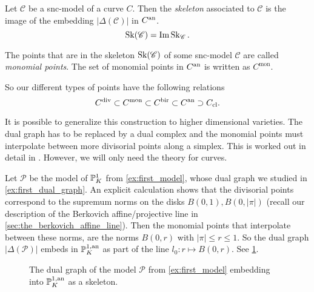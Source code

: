 \begin{definition}
	Let $\mathscr C$ be a snc-model of a curve $C$. 
	Then the \emph{skeleton} associated to $\mathscr C$ is the image of the embedding $|\Delta(\mathscr C)|$ in $C{}^{\text{an}}$. 
	\[
		\operatorname{Sk}(\mathscr C) = \operatorname{Im} \operatorname{Sk}_{\mathscr C}
	.\] 
\end{definition}
\begin{definition}
	The points that are in the skeleton $\operatorname{Sk}(\mathscr C)$ of some snc-model $\mathscr C$ are called \emph{monomial points}. 
	The set of monomial points in $C{}^{\text{an}}$ is written as  $C^{\text{mon}}$. 
\end{definition}

So our different types of points have the following relations \[
C^{\text{div}} \subset C^{\text{mon}} \subset C{}^{\text{bir}} \subset C{}^{\text{an}} \supset C_\text{cl}
.\] 

\begin{remark}
	It is possible to generalize this construction to higher dimensional varieties. 
	The dual graph has to be replaced by a dual complex and the monomial points must interpolate between more divisorial points along a simplex.
	This is worked out in detail in \cite{mustataWeightFunctionsNonArchimedean2015}. 
	However, we will only need the theory for curves. 
\end{remark}

\begin{example}
	Let $\mathscr P$ be the model of $\mathbb{P}^{1}_K$ from \cref{ex:first_model}, whose dual graph we studied in \cref{ex:first_dual_graph}.
	An explicit calculation shows that the divisorial points correspond to the supremum norms on the disks $B(0, 1), B(0, |\pi|)$ (recall our description of the Berkovich affine/projective line in \cref{sec:the_berkovich_affine_line}).
	Then the monomial points that interpolate between these norms, are the norms $B(0, r)$ with $|\pi| \le r \le 1$.
	So the dual graph $|\Delta(\mathscr P)|$ embeds in $\mathbb{P}_K^{1, \text{an}}$ as part of the line $l_0: r \mapsto B(0, r)$. 
	See \cref{fig:skeleton_projective_line}. 
\end{example}
\begin{figure}[ht]
    \centering
    \caption{The dual graph of the model $\mathscr P$ from \cref{ex:first_model} embedding into $\mathbb{P}_K^{1, \text{an}}$ as a skeleton.}
    \label{fig:skeleton_projective_line}
\end{figure}


